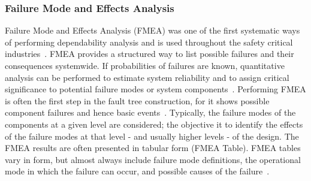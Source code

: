 \subsubsection{Failure Mode and Effects Analysis}
 Failure Mode and Effects Analysis (FMEA) was one of the first systematic ways of performing dependability analysis and is used throughout the safety critical industries~\cite{rausand2003system,Bozzano:2011:SDP:1992983.1992988}. FMEA provides a structured way to list possible failures and their consequences systemwide. If probabilities of failures are known, quantitative analysis can be performed to estimate system reliability and to assign critical significance to potential failure modes or system components~\cite{MilStandardFMEA}. Performing FMEA is often the first step in the fault tree construction, for it shows possible component failures and hence basic events~\cite{0f356f05e72f43018211b36f97c8854a}. Typically, the failure modes of the components at a given level are considered; the objective it to identify the effects of the failure modes at that level - and usually higher levels - of the design. The FMEA results are often presented in tabular form (FMEA Table). FMEA tables vary in form, but almost always include failure mode definitions, the operational mode in which the failure can occur, and possible causes of the failure~\cite{Bozzano:2010:DSA:1951720}.
